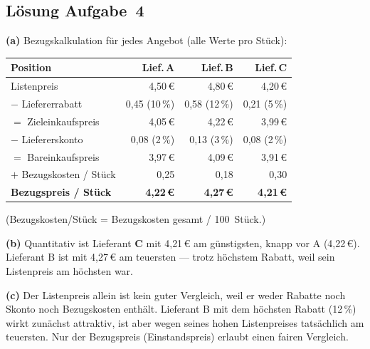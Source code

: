 \documentclass[11pt, a4paper]{article}
\begin{document}
\subsection*{Lösung Aufgabe~4}
\begin{loesung}
\textbf{(a)} Bezugskalkulation für jedes Angebot (alle Werte pro Stück):

\begin{center}
\begin{tabular}{lrrr}
\toprule
\textbf{Position} & \textbf{Lief.\,A} & \textbf{Lief.\,B} & \textbf{Lief.\,C}\\
\midrule
Listenpreis & 4{,}50\,€ & 4{,}80\,€ & 4{,}20\,€\\
$-$ Liefererrabatt & 0{,}45 (10\,\%) & 0{,}58 (12\,\%) & 0{,}21 (5\,\%)\\
$=$ Zieleinkaufspreis & 4{,}05\,€ & 4{,}22\,€ & 3{,}99\,€\\
$-$ Liefererskonto & 0{,}08 (2\,\%) & 0{,}13 (3\,\%) & 0{,}08 (2\,\%)\\
$=$ Bareinkaufspreis & 3{,}97\,€ & 4{,}09\,€ & 3{,}91\,€\\
$+$ Bezugskosten / Stück & 0{,}25 & 0{,}18 & 0{,}30\\
\midrule
\textbf{Bezugspreis / Stück} & \textbf{4{,}22\,€} & \textbf{4{,}27\,€} & \textbf{4{,}21\,€}\\
\bottomrule
\end{tabular}
\end{center}

(Bezugskosten/Stück = Bezugskosten gesamt / 100~Stück.)

\textbf{(b)} Quantitativ ist Lieferant \textbf{C} mit 4{,}21\,€ am günstigsten,
knapp vor A (4{,}22\,€). Lieferant B ist mit 4{,}27\,€ am teuersten --- trotz höchstem
Rabatt, weil sein Listenpreis am höchsten war.

\textbf{(c)} Der Listenpreis allein ist kein guter Vergleich, weil er weder Rabatte noch
Skonto noch Bezugskosten enthält. Lieferant B mit dem höchsten Rabatt (12\,\%) wirkt
zunächst attraktiv, ist aber wegen seines hohen Listenpreises tatsächlich am teuersten.
Nur der Bezugspreis (Einstandspreis) erlaubt einen fairen Vergleich.
\end{loesung}
\end{document}
